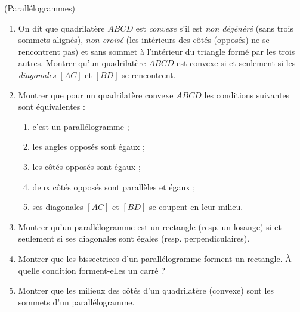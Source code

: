 \documentclass[a4paper,11pt,reqno]{amsart}
\begin{document}
\begin{exo} (Parallélogrammes) %

  \begin{enumerate}
    \item On dit que quadrilatère $ABCD$ est \emph{convexe} s'il est \emph{non dégénéré} (sans trois sommets alignés), \emph{non croisé} (les intérieurs des côtés (opposés) ne se rencontrent pas) et sans sommet à l'intérieur du triangle formé par les trois autres. Montrer qu'un quadrilatère $ABCD$ est convexe si et seulement si les \emph{diagonales} $[AC]$ et $[BD]$ se rencontrent.
    \item Montrer que pour un quadrilatère convexe $ABCD$ les conditions suivantes sont équivalentes :
    \begin{enumerate}
      \item c'est un parallélogramme ;
      \item les angles opposés sont égaux ;
      \item les côtés opposés sont égaux ;
      \item deux côtés opposés sont parallèles et égaux ;
      \item ses diagonales $[AC]$ et $[BD]$ se coupent en leur milieu.
    \end{enumerate}
    \item Montrer qu'un parallélogramme est un rectangle (resp. un losange) si et seulement si ses diagonales sont égales (resp. perpendiculaires).
    \item Montrer que les bissectrices d'un parallélogramme forment un rectangle. À quelle condition forment-elles un carré ?
    \item Montrer que les milieux des côtés d'un quadrilatère (convexe) sont les sommets d'un parallélogramme.
  \end{enumerate}
\end{exo}
\end{document}
